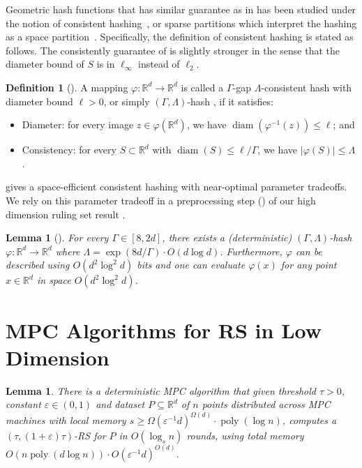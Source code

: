 \documentclass[11pt,letterpaper]{article}
\theoremstyle{plain}
\newtheorem{lemma}[theorem]{Lemma}
\theoremstyle{definition}
\newtheorem{definition}[theorem]{Definition}
\theoremstyle{remark}
\DeclareMathOperator{\poly}{poly}
\DeclareMathOperator{\diam}{diam}
\renewcommand{\epsilon}{\ensuremath{\varepsilon}}
\let\epsilon\varepsilon
\begin{document}
Geometric hash functions that has similar guarantee as in  has been studied under the notion of consistent hashing~\cite{CJKVY22}, or sparse partitions which interpret the hashing as a space partition~\cite{JLNRS05,Filtser24}.
Specifically, the definition of consistent hashing is stated as follows.
The consistently guarantee of  is slightly stronger in the sense that the diameter bound of $S$ is in $\ell_\infty$ instead of $\ell_2$.
\begin{definition}[{\cite[Definition 1.6]{CJKVY22}}]
    \label{def:consistent_hash}
    A mapping $\varphi: \mathbb{R}^{d} \to \mathbb{R}^{d}$ is called a $\Gamma$-gap $\Lambda$-consistent hash with diameter bound $\ell>0$, or simply $(\Gamma, \Lambda)$-hash , if it satisfies: 
    \begin{itemize}
        \item Diameter: for every image $z\in \varphi(\mathbb{R}^{d})$, we have $\diam(\varphi^{-1}(z))\leq \ell$; and 
        \item Consistency: for every $S\subset \mathbb{R}^{d}$ with $\diam(S)\leq \ell/ \Gamma$, we have $|\varphi(S)|\leq \Lambda$. 
    \end{itemize}
\end{definition}
 gives a space-efficient consistent hashing with near-optimal parameter tradeoffs.
We rely on this parameter tradeoff in a preprocessing step () of our high dimension ruling set result .
\begin{lemma}[{\cite[Theorem 5.1]{CJKVY22}}]
    \label{lemma:consist_hash}
    For every $\Gamma\in [8, 2d]$, there exists a (deterministic) $(\Gamma, \Lambda)$-hash $\varphi: \mathbb{R}^{d} \to \mathbb{R}^{d}$
    where $\Lambda = \exp(8d/\Gamma) \cdot O(d\log d)$. 
    Furthermore, $\varphi$ can be described using $O(d^{2}\log^{2}d)$ bits and one can evaluate $\varphi(x)$ for any point $x\in \mathbb{R}^{d}$ in space $O(d^{2}\log^{2}d)$. 
\end{lemma}
     \section{MPC Algorithms for RS in Low Dimension}
\label{sec:MIS}
\begin{lemma}
    \label{thm:MIS}
    There is a deterministic MPC algorithm that given threshold $\tau>0$, constant $\varepsilon\in (0, 1)$ and dataset $P\subseteq \mathbb{R}^d$ of $n$ points distributed across MPC machines with local memory $s\geq \Omega(\varepsilon^{-1}d)^{\Omega(d)}\cdot \poly(\log n)$, 
computes a $(\tau, (1 + \epsilon)\tau)$-RS for $P$ in $O(\log_{s}n)$ rounds, using total memory $O(n\poly(d\log n))\cdot O(\varepsilon^{-1}d)^{O(d)}$. 
\end{lemma}
\end{document}
